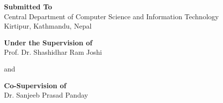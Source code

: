 \begin{center}
{\Large \textbf{{Submitted To}\\}}	%
{\large Central Department of Computer Science and Information Technology\\
					Kirtipur, Kathmandu, Nepal }\par
					
{\Large\vspace*{5mm} \textbf {Under the Supervision of}\\
			\vspace*{3mm}\large Prof. Dr. Shashidhar Ram Joshi }\par %
{\Large\vspace*{2mm} and \par\vspace*{2mm} \textbf{Co-Supervision of}\\
			\vspace*{3mm}\large Dr. Sanjeeb Prasad Panday}\par %
\end{center}